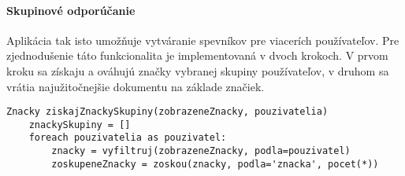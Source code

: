 \paragraph{Skupinové odporúčanie}

Aplikácia tak isto umožňuje vytváranie spevníkov pre viacerích používateľov. Pre zjednodušenie
táto funkcionalita je implementovaná v dvoch krokoch. V prvom kroku sa získaju a ováhujú značky
vybranej skupiny používateľov, v druhom sa vrátia najužitočnejšie dokumentu na základe značiek.

\begin{lstlisting}[label=lst:group_tags, caption=Získanie značiek skupiny používateľov]
Znacky ziskajZnackySkupiny(zobrazeneZnacky, pouzivatelia)
    znackySkupiny = []
    foreach pouzivatelia as pouzivatel:
        znacky = vyfiltruj(zobrazeneZnacky, podla=pouzivatel)
        zoskupeneZnacky = zoskou(znacky, podla='znacka', pocet(*))

\end{lstlisting}

%
%
%
%

